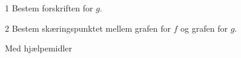 \documentclass[12pt,x11names,a4paper]{article}
\begin{document}
\begin{delopgave}{}{1}
	Bestem forskriften for $g$. 
\end{delopgave}
\begin{delopgave}{}{2}
	Bestem skæringspunktet mellem grafen for $f$ og grafen for $g$. 
\end{delopgave}
\newpage

\begin{center}
	\LARGE Med hjælpemidler
\end{center}
\end{document}
